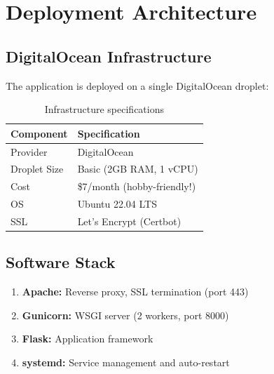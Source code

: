 \documentclass[10pt,a4paper]{article}
\begin{document}
\begin{center}
\end{center}

\newpage

\section{Deployment Architecture}

\subsection{DigitalOcean Infrastructure}

The application is deployed on a single DigitalOcean droplet:

\begin{table}[H]
\centering
\begin{tabular}{ll}
\toprule
\textbf{Component} & \textbf{Specification} \\
\midrule
Provider & DigitalOcean \\
Droplet Size & Basic (2GB RAM, 1 vCPU) \\
Cost & \$7/month (hobby-friendly!) \\
OS & Ubuntu 22.04 LTS \\
SSL & Let's Encrypt (Certbot) \\
\bottomrule
\end{tabular}
\caption{Infrastructure specifications}
\end{table}

\subsection{Software Stack}

\begin{enumerate}
    \item \textbf{Apache:} Reverse proxy, SSL termination (port 443)
    \item \textbf{Gunicorn:} WSGI server (2 workers, port 8000)
    \item \textbf{Flask:} Application framework
    \item \textbf{systemd:} Service management and auto-restart
\end{enumerate}
\end{document}
